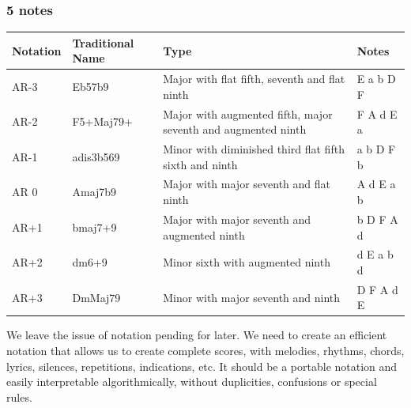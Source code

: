 \documentclass[]{report}
\begin{document}
\subsubsection*{5 notes}
\begin{table}[H]
\centering
\begin{tabularx}{\textwidth}{ll>{\raggedright\arraybackslash}Xl}
\toprule
Notation & Traditional Name & Type & Notes \\
\midrule
\textsf{AR-3} & Eb57b9 & Major with flat fifth, seventh and flat ninth & E a b D F \\
\textsf{AR-2} & F5+Maj79+ & Major with augmented fifth, major seventh and augmented ninth & F A d E a \\
\textsf{AR-1} & adis3b569 & Minor with diminished third flat fifth sixth and ninth & a b D F b \\
\textsf{AR 0} & Amaj7b9 & Major with major seventh and flat ninth & A d E a b \\
\textsf{AR+1} & bmaj7+9 & Major with major seventh and augmented ninth & b D F A d \\
\textsf{AR+2} & dm6+9 & Minor sixth with augmented ninth & d E a b d \\
\textsf{AR+3} & DmMaj79 & Minor with major seventh and ninth & D F A d E \\
\bottomrule
\end{tabularx}
\end{table}
We leave the issue of notation pending for later. We need to create an efficient notation that allows us to create complete scores, with melodies, rhythms, chords, lyrics, silences, repetitions, indications, etc.
It should be a portable notation and easily interpretable algorithmically, without duplicities, confusions or special rules.
\end{document}
